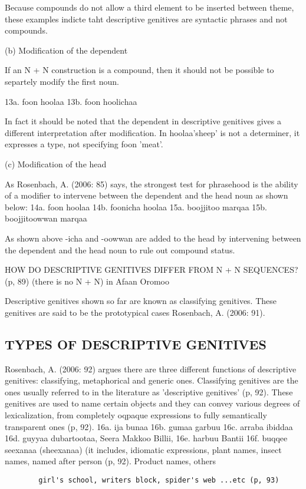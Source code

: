 \documentclass[11pt,a4paper]{article}
\begin{document}
	
	Because compounds do not allow a third element to be inserted between theme, these examples indicte taht descriptive genitives are syntactic phrases 
	and not compounds. 
	
	(b) Modification of the dependent
	
	If an N + N construction is a compound, then it should not be possible to separtely modify the first noun. 
	
	13a. foon hoolaa
	13b. foon hoolichaa
	
	
	In fact it should be noted that the dependent in descriptive genitives gives a different interpretation after modification.
	In hoolaa'sheep' is not a determiner, it expresses a type, not specifying foon 'meat'. 
	
	(c) Modification of the head
	
	As Rosenbach, A. (2006: 85) says, the strongest test for phrasehood is the ability of a modifier to intervene between
	the dependent and the head noun as shown below:
	14a. foon hoolaa
	14b. foonicha hoolaa
	15a. boojjitoo marqaa
	15b. boojjitoowwan marqaa
	
	As shown above -icha and -oowwan are added to the head by intervening between the dependent and the head noun
	to rule out compound status. 
	
	HOW DO DESCRIPTIVE GENITIVES DIFFER FROM N + N SEQUENCES? (p, 89) (there is no N + N) in Afaan Oromoo
	
	Descriptive genitives shown so far are known as classifying genitives. These genitives are said to be the prototypical cases 
	Rosenbach, A. (2006: 91). 
	
	\subsection{TYPES OF DESCRIPTIVE GENITIVES}
	
	Rosenbach, A. (2006: 92) argues there are three different functions of descriptive genitives: classifying, metaphorical and generic ones. 
	Classifying genitives are the ones usually referred to in the literature as 'descriptive genitives' (p, 92). These genitives
	are used to name certain objects and they can convey various degrees of lexicalization, from completely oqpaque expressions
	to fully semantically transparent ones (p, 92). 
	16a. ija bunaa
	16b. gumaa garbuu
	16c. arraba ibiddaa
	16d. guyyaa dubartootaa, Seera Makkoo Billii, 
	16e. harbuu Bantii
	16f. buqqee seexanaa (sheexanaa)
	(it includes, idiomatic expressions, plant names, insect names, named after person (p, 92). Product names, others
	\begin{verbatim}
		girl's school, writers block, spider's web ...etc (p, 93)
	\end{verbatim}
	
\end{document}
